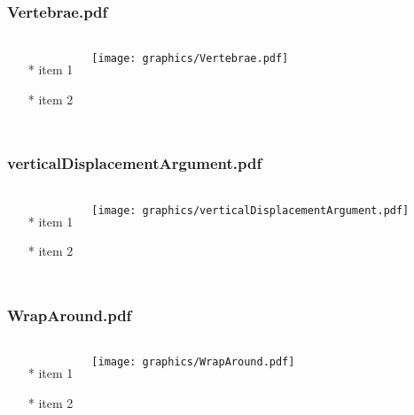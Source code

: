 \begin{frame} \frametitle{Vertebrae.pdf}
    \begin{columns}[c]
        \begin{itemize}
            \item[*] item 1
            \item[*] item 2
        \end{itemize}
        \begin{minipage}{\linewidth}
            \begin{center}
            \texttt{[image: graphics/Vertebrae.pdf]}
            \label{gfx:Vertebrae.pdf}
            \end{center}
        \end{minipage}
    \end{columns}
\end{frame}
\begin{frame} \frametitle{verticalDisplacementArgument.pdf}
    \begin{columns}[c]
        \begin{itemize}
            \item[*] item 1
            \item[*] item 2
        \end{itemize}
        \begin{minipage}{\linewidth}
            \begin{center}
            \texttt{[image: graphics/verticalDisplacementArgument.pdf]}
            \label{gfx:verticalDisplacementArgument.pdf}
            \end{center}
        \end{minipage}
    \end{columns}
\end{frame}
\begin{frame} \frametitle{WrapAround.pdf}
    \begin{columns}[c]
        \begin{itemize}
            \item[*] item 1
            \item[*] item 2
        \end{itemize}
        \begin{minipage}{\linewidth}
            \begin{center}
            \texttt{[image: graphics/WrapAround.pdf]}
            \label{gfx:WrapAround.pdf}
            \end{center}
        \end{minipage}
    \end{columns}
\end{frame}
